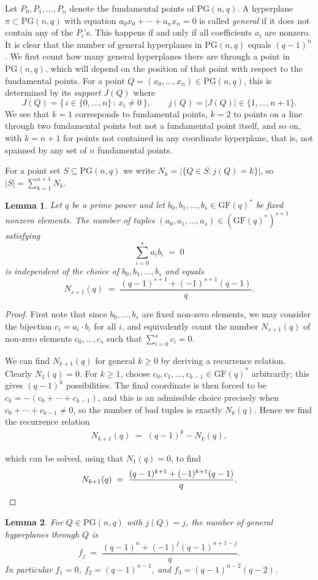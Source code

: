 \documentclass{article}
\newtheorem{lemma}{Lemma}
\newcommand{\PG}{\mathrm{PG}}
\begin{document}
Let $P_0,P_1,\dots,P_n$ denote the fundamental points of
$\PG(n,q)$. A hyperplane
$\pi\subset\PG(n,q)$ with equation $a_0x_0+\cdots+a_nx_n=0$ is called
\emph{general} if it does not contain any of the $P_i$'s. This happens if and only if all coefficients $a_i$ are nonzero. It is clear that the number of general hyperplanes in $\PG(n,q)$ equals $(q-1)^n$. We first count how many general hyperplanes there are through a point in $\PG(n,q)$, which will depend on the position of that point with respect to the fundamental points. For a point $Q=(x_0,\ldots,x_n)\in\PG(n,q)$, this is determined by its \emph{support} $J(Q)$ where
\[
  J(Q)=\{\,i\in\{0,\dots,n\}\,:\,x_i\neq 0\,\},\qquad j(Q)=|J(Q)|\in\{1,\dots,n+1\}.
\]
We see that $k=1$ corresponds to fundamental points, $k=2$ to points on
a line through two fundamental points but not a fundamental point itself, and so on, with $k=n+1$ for points not contained in any coordinate hyperplane, that is, not spanned by any set of $n$ fundamental points.

For a point set $S\subseteq\PG(n,q)$ we write $N_k=|\{Q\in S:j(Q)=k\}|$, so
$|S|=\sum_{k=1}^{n+1}N_k$.

\begin{lemma} \label{lem:sumset}
Let $q$ be a prime power and let $b_0,b_1,\dots,b_s \in \mathrm{GF}(q)^*$ be
fixed nonzero elements. The number of tuples
$(a_0,a_1,\dots,a_s) \in (\mathrm{GF}(q)^*)^{s+1}$ satisfying
\[
    \sum_{i=0}^{s} a_i b_i \;=\; 0
\]
is independent of the choice of $b_0,b_1,\dots,b_s$ and equals
\[
    N_{s+1}(q) \;=\; \frac{(q-1)^{s+1} + (-1)^{s+1}(q-1)}{q}.
\]
\end{lemma}

\begin{proof}
First note that since $b_0,\ldots,b_s$ are fixed non-zero elements, we may consider the bijection $c_i=a_i\cdot b_i$ for all $i$, and equivalently count the number $N_{s+1}(q)$ of non-zero elements $c_0,\ldots,c_s$ such that $\sum_{i=0}^{s} c_i = 0.$


We can find $N_{k+1}(q)$ for general $k \geq 0$ by deriving a recurrence relation. Clearly $N_1(q)=0$. For $k \geq 1$, choose $c_0,c_1,\dots,c_{k-1} \in \mathrm{GF}(q)^*$ arbitrarily; this
gives $(q-1)^{k}$ possibilities. The final coordinate is then forced to be
$c_k = -(c_0 + \cdots + c_{k-1})$, and this is an admissible choice precisely when
$c_0 + \cdots + c_{k-1} \neq 0$, so the number of bad tuples is exactly $N_{k}(q)$. Hence we find the recurrence relation
\begin{align*}
    N_{k+1}(q) \;=\; (q-1)^{k} - N_{k}(q),
\end{align*}

which can be solved, using that $N_1(q)=0$, to find
\[
    N_{k+1}(q) \;=\; \frac{(q-1)^{k+1} + (-1)^{k+1} (q-1)}{q}. \qedhere
\]
\end{proof}
\begin{lemma}\label{lem:fj}
For $Q\in\PG(n,q)$ with $j(Q)=j$, the number of general hyperplanes through
$Q$ is
\[
  f_j \;=\; \frac{(q-1)^n+(-1)^j(q-1)^{n+1-j}}{q}.
\]
In particular $f_1=0$, $f_2=(q-1)^{n-1}$, and
$f_3=(q-1)^{n-2}(q-2)$.
\end{lemma}
\end{document}
